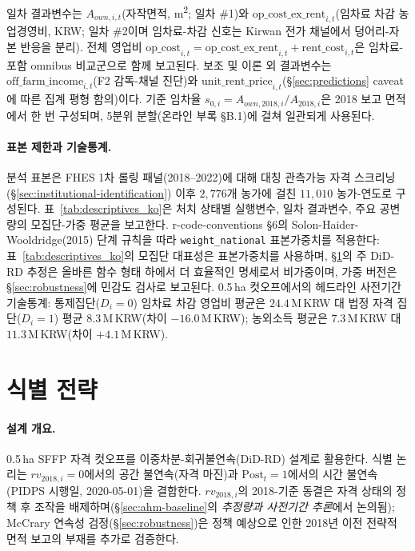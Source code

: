\documentclass[12pt, a4paper]{article}
\begin{document}
일차 결과변수는 $A_{own,i,t}$(자작면적, m\textsuperscript{2}; 일차 \#1)와 $\text{op\_cost\_ex\_rent}_{i,t}$(임차료 차감 농업경영비, KRW; 일차 \#2이며 임차료-차감 신호는 Kirwan 전가 채널에서 덩어리-자본 반응을 분리). 전체 영업비 $\text{op\_cost}_{i,t} = \text{op\_cost\_ex\_rent}_{i,t} + \text{rent\_cost}_{i,t}$은 임차료-포함 omnibus 비교군으로 함께 보고된다. 보조 및 이론 외 결과변수는 $\text{off\_farm\_income}_{i,t}$(F2 감독-채널 진단)와 $\text{unit\_rent\_price}_{i,t}$(\S\ref{sec:predictions} caveat에 따른 집계 평형 함의)이다. 기준 임차율 $s_{0,i} = A_{own,2018,i}/A_{2018,i}$은 2018 보고 면적에서 한 번 구성되며, 5분위 분할(온라인 부록 \S B.1)에 걸쳐 일관되게 사용된다.

\paragraph{표본 제한과 기술통계.} 분석 표본은 FHES 1차 롤링 패널(2018--2022)에 대해 대칭 관측가능 자격 스크리닝(\S\ref{sec:institutional-identification}) 이후 $2{,}776$개 농가에 걸친 $11{,}010$ 농가-연도로 구성된다. 표~\ref{tab:descriptives_ko}은 처치 상태별 실행변수, 일차 결과변수, 주요 공변량의 모집단-가중 평균을 보고한다. r-code-conventions \S6의 Solon-Haider-Wooldridge(2015) 단계 규칙을 따라 \texttt{weight\_national} 표본가중치를 적용한다: 표~\ref{tab:descriptives_ko}의 모집단 대표성은 표본가중치를 사용하며, \S\ref{sec:identification}의 주 DiD-RD 추정은 올바른 함수 형태 하에서 더 효율적인 명세로서 비가중이며, 가중 버전은 \S\ref{sec:robustness}에 민감도 검사로 보고된다. 0.5\,ha 컷오프에서의 헤드라인 사전기간 기술통계: 통제집단($D_i = 0$) 임차료 차감 영업비 평균은 $24.4$\,M\,KRW 대 법정 자격 집단($D_i = 1$) 평균 $8.3$\,M\,KRW(차이 $-16.0$\,M\,KRW); 농외소득 평균은 $7.3$\,M\,KRW 대 $11.3$\,M\,KRW(차이 $+4.1$\,M\,KRW).



\section{식별 전략}
\label{sec:identification}

\paragraph{설계 개요.} 0.5\,ha SFFP 자격 컷오프를 이중차분-회귀불연속(DiD-RD) 설계로 활용한다. 식별 논리는 $rv_{2018,i} = 0$에서의 공간 불연속(자격 마진)과 $\text{Post}_t = 1$에서의 시간 불연속(PIDPS 시행일, 2020-05-01)을 결합한다. $rv_{2018,i}$의 2018-기준 동결은 자격 상태의 정책 후 조작을 배제하며(\S\ref{sec:ahm-baseline}의 \textit{추정량과 사전기간 추론}에서 논의됨); McCrary 연속성 검정(\S\ref{sec:robustness})은 정책 예상으로 인한 2018년 이전 전략적 면적 보고의 부재를 추가로 검증한다.
\end{document}
